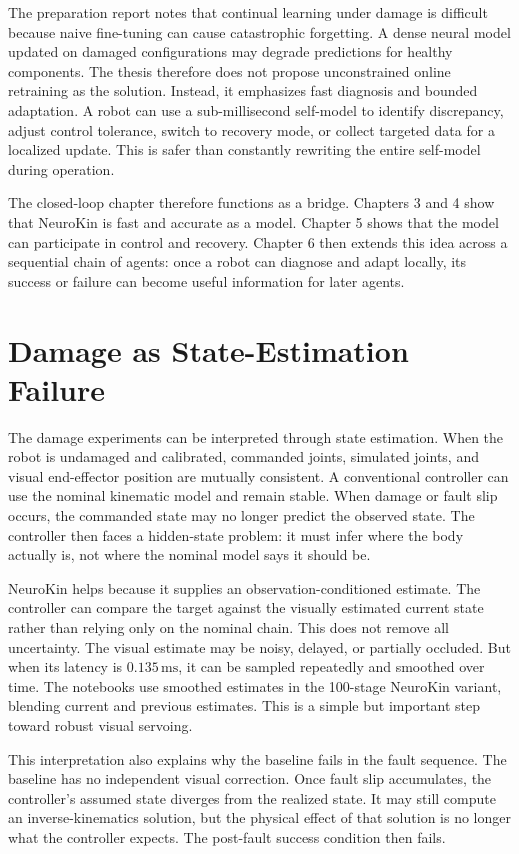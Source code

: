 \documentclass[12pt,a4paper,oneside]{report}
\begin{document}
The preparation report notes that continual learning under damage is difficult because naive fine-tuning can cause catastrophic forgetting. A dense neural model updated on damaged configurations may degrade predictions for healthy components. The thesis therefore does not propose unconstrained online retraining as the solution. Instead, it emphasizes fast diagnosis and bounded adaptation. A robot can use a sub-millisecond self-model to identify discrepancy, adjust control tolerance, switch to recovery mode, or collect targeted data for a localized update. This is safer than constantly rewriting the entire self-model during operation.

The closed-loop chapter therefore functions as a bridge. Chapters 3 and 4 show that NeuroKin is fast and accurate as a model. Chapter 5 shows that the model can participate in control and recovery. Chapter 6 then extends this idea across a sequential chain of agents: once a robot can diagnose and adapt locally, its success or failure can become useful information for later agents.

\section{Damage as State-Estimation Failure}

The damage experiments can be interpreted through state estimation. When the robot is undamaged and calibrated, commanded joints, simulated joints, and visual end-effector position are mutually consistent. A conventional controller can use the nominal kinematic model and remain stable. When damage or fault slip occurs, the commanded state may no longer predict the observed state. The controller then faces a hidden-state problem: it must infer where the body actually is, not where the nominal model says it should be.

NeuroKin helps because it supplies an observation-conditioned estimate. The controller can compare the target against the visually estimated current state rather than relying only on the nominal chain. This does not remove all uncertainty. The visual estimate may be noisy, delayed, or partially occluded. But when its latency is $0.135\,\mathrm{ms}$, it can be sampled repeatedly and smoothed over time. The notebooks use smoothed estimates in the 100-stage NeuroKin variant, blending current and previous estimates. This is a simple but important step toward robust visual servoing.

This interpretation also explains why the baseline fails in the fault sequence. The baseline has no independent visual correction. Once fault slip accumulates, the controller's assumed state diverges from the realized state. It may still compute an inverse-kinematics solution, but the physical effect of that solution is no longer what the controller expects. The post-fault success condition then fails.
\end{document}
